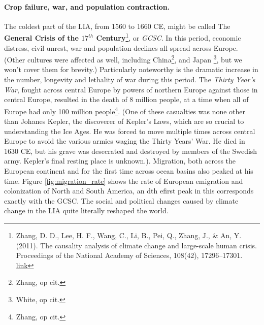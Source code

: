 \documentclass[amstex,12pt]{book}
\begin{document}
\paragraph{Crop failure, war, and population contraction.}
The coldest part of the LIA, from 1560 to 1660 CE, might be called The \textbf{General Crisis of the $17^{th}$ Century}\footnote{Zhang, D. D., Lee, H. F., Wang, C., Li, B., Pei, Q., Zhang, J., \& An, Y. (2011). The causality analysis of climate change and large-scale human crisis. Proceedings of the National Academy of Sciences, 108(42), 17296–17301. \href{https://doi.org/10.1073/pnas.1104268108}{link}}, or \textit{GCSC}. In this period, economic distress, civil unrest, war and population declines all spread across Europe. (Other cultures were affected as well, including China\footnote{Zhang, op cit.}, and Japan \footnote{White, op cit.}, but we won't cover them for brevity.) Particularly noteworthy is the dramatic increase in the number, longevity and lethality of war during this period. The \textit{Thirty Year's War}, fought across central Europe by powers of northern Europe against those in central Europe, resulted in the death of 8 million people, at a time when all of Europe had only 100 million people\footnote{Zhang, op cit.}. (One of these casualties was none other than Johanes Kepler, the discoverer of Kepler's Laws, which are so crucial to understanding the Ice Ages. He was forced to move multiple times across central Europe to avoid the various armies waging the Thirty Years' War. He died in 1630 CE, but his grave was desecrated and destroyed by members of the Swedish army. Kepler's final resting place is unknown.). Migration, both across the European continent and for the first time across ocean basins also peaked at his time. Figure \ref{fig:migration_rate} shows the rate of European emigration and colonization of North and South America, an dth efirst peak in this corresponds exactly with the GCSC. The social and political changes caused by climate change in the LIA quite literally reshaped the world.\\
\end{document}
